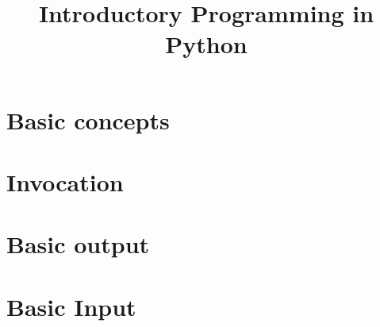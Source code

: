 \documentclass[a4paper,11pt]{report}
\title{Introductory Programming in Python}
\begin{document}
\maketitle
\chapter{Basic concepts}
    
\chapter{Invocation}
    
\chapter{Basic output}
    
\chapter{Basic Input}
    
%    
%    
%    
%    
%    
%    
%    
%    
%    
%    
%    
%    
\end{document}

